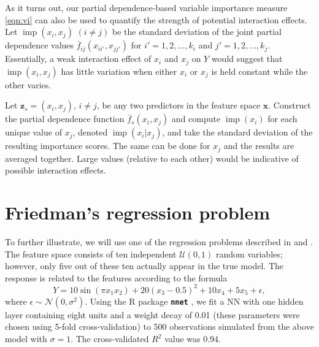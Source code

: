 \documentclass[12pt]{article}
\newcommand{\pkg}[1]{\texorpdfstring%
{{\normalfont\fontseries{b}\selectfont #1}}%
{#1}}
\def\pkg#1{\textbf{\texttt{#1}}}
\DeclareMathOperator{\imp}{imp}
\begin{document}
As it turns out, our partial dependence-based variable importance measure \eqref{eqn:vi} can also be used to quantify the strength of potential interaction effects. Let $\imp\left(x_i, x_j\right)$ $\left(i \ne j\right)$ be the standard deviation of the joint partial dependence values $\bar{f}_{ij}\left(x_{ii'}, x_{jj'}\right)$ for $i' = 1, 2, \dots, k_i$ and  $j' = 1, 2, \dots, k_j$. Essentially, a weak interaction effect of $x_i$ and $x_j$ on $Y$ would suggest that $\imp\left(x_i, x_j\right)$ has little variation when either $x_i$ or $x_j$ is held constant while the other varies. 

Let $\boldsymbol{z}_s = \left(x_i, x_j\right)$, $i \neq j$, be any two predictors in the feature space $\boldsymbol{x}$. Construct the partial dependence function $\bar{f}_s\left(x_i, x_j\right)$ and compute $\imp\left(x_i\right)$ for each unique value of $x_j$, denoted $\imp\left(x_i | x_j\right)$, and take the standard deviation of the resulting importance scores. The same can be done for $x_j$ and the results are averaged together. Large values (relative to each other) would be indicative of possible interaction effects. 


\section{Friedman's regression problem}

To further illustrate, we will use one of the regression problems described in \citet{multivariate-friedman-1991} and \citet{bagging-breiman-1996}. The feature space consists of ten independent $\mathcal{U}\left(0, 1\right)$ random variables; however, only five out of these ten actually appear in the true model. The response is related to the features according to the formula
\begin{equation*}
Y = 10 \sin\left(\pi x_1 x_2\right) + 20 \left(x_3 - 0.5\right) ^ 2 + 10 x_4 + 5 x_5 + \epsilon,
\end{equation*}
where $\epsilon \sim \mathcal{N}\left(0, \sigma^2\right)$. Using the R package \pkg{nnet} \citep{venables-modern-2002}, we fit a NN with one hidden layer containing eight units and a weight decay of 0.01 (these parameters were chosen using 5-fold cross-validation) to 500 observations simulated from the above model with $\sigma = 1$. The cross-validated $R^2$ value was 0.94.
\end{document}
